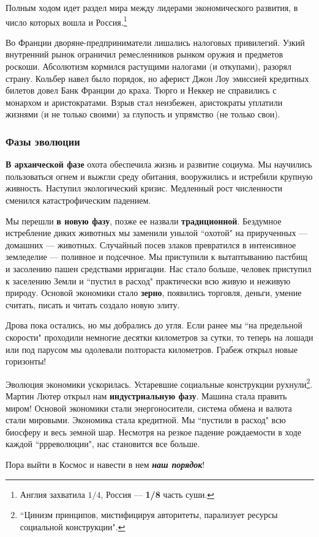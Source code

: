 Полным ходом идет раздел мира между лидерами экономического развития, в число которых вошла и
Россия.\footnote{Англия захватила $1/4$, Россия — \textbf{1/8} часть суши.}

Во Франции дворяне-предприниматели лишались налоговых привилегий. Узкий внутренний рынок ограничил ремесленников
рынком оружия и предметов роскоши. Абсолютизм кормился растущими налогами (и откупами), разорял страну. Кольбер навел
было порядок, но аферист Джон Лоу эмиссией кредитных билетов довел Банк Франции до краха. Тюрго и Неккер не справились
с монархом и аристократами. Взрыв стал неизбежен, аристократы уплатили жизнями (и не только своими) за глупость и
упрямство (не только свои).

\subsubsection{Фазы эволюции}

\textbf{В архаической фазе }охота обеспечила жизнь и развитие социума. Мы научились пользоваться огнем и выжгли среду
обитания, вооружились и истребили крупную живность. Наступил экологический кризис. Медленный рост численности сменился
катастрофическим падением.


Мы перешли \textbf{в новую фазу}, позже ее назвали \textbf{традиционной}. Бездумное истребление диких животных мы
заменили унылой ``охотой" на прирученных — домашних — животных. Случайный посев злаков
превратился в интенсивное земледелие — поливное и подсечное. Мы приступили к вытаптыванию пастбищ и засолению пашен
средствами ирригации. Нас стало больше, человек приступил к заселению Земли и ``пустил в
расход" практически всю живую и неживую природу. Основой экономики стало \textbf{зерно}, появились
торговля, деньги, умение считать, писать и читать создало новую элиту.


Дрова пока остались, но мы добрались до угля. Если ранее мы ``на предельной скорости" проходили немногие десятки километров за сутки, то теперь на лошади или под парусом мы одолевали полтораста километров.
Грабеж открыл новые горизонты!


Эволюция экономики ускорилась. Устаревшие социальные конструкции рухнули\footnote{``Цинизм
принципов, мистифицируя авторитеты, парализует ресурсы социальной конструкции".}. Мартин Лютер открыл
нам \textbf{индустриальную фазу}. Машина стала править миром! Основой экономики стали энергоносители, система обмена и
валюта стали мировыми. Экономика стала кредитной. Мы ``пустили в расход" всю биосферу и весь
земной шар. Несмотря на резкое падение рождаемости в ходе каждой ``ррреволюции", нас
становится все больше.


Пора выйти в Космос и навести в нем \textbf{\textit{наш порядок}}!
%
